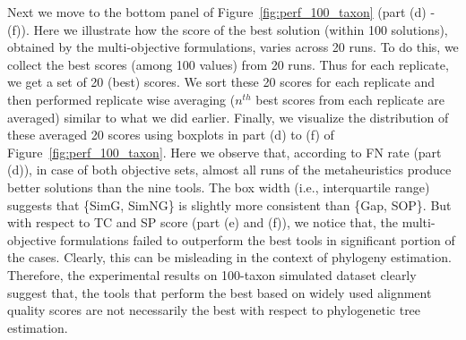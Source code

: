 Next we move to the bottom panel of Figure~\ref{fig:perf_100_taxon} (part (d) - (f)). Here we illustrate how the score of the best solution (within 100 solutions), obtained by the multi-objective formulations, varies across 20 runs. To do this, we collect the best scores (among 100 values) from 20 runs. Thus for each replicate, we get a set of 20 (best) scores. We sort these 20 scores for each replicate and then performed replicate wise averaging ($n^{th}$ best scores from each replicate are averaged) similar to what we did earlier. 
Finally, we visualize the distribution of these averaged 20 scores using boxplots in part (d) to (f) of Figure~\ref{fig:perf_100_taxon}. Here we observe that, according to FN rate (part (d)), in case of both objective sets, almost all runs of the metaheuristics produce better solutions than the nine tools. 
The box width (i.e., interquartile range) suggests that \{SimG, SimNG\} is slightly more consistent than \{Gap, SOP\}. But with respect to TC and SP score (part (e) and (f)), we notice that, the multi-objective formulations failed to outperform the best tools in significant portion of the cases. Clearly, this can be misleading in the context of phylogeny estimation. Therefore, the experimental results on 100-taxon simulated dataset clearly suggest that, the tools that perform the best based on widely used alignment quality scores are not necessarily the best with respect to phylogenetic tree estimation.


